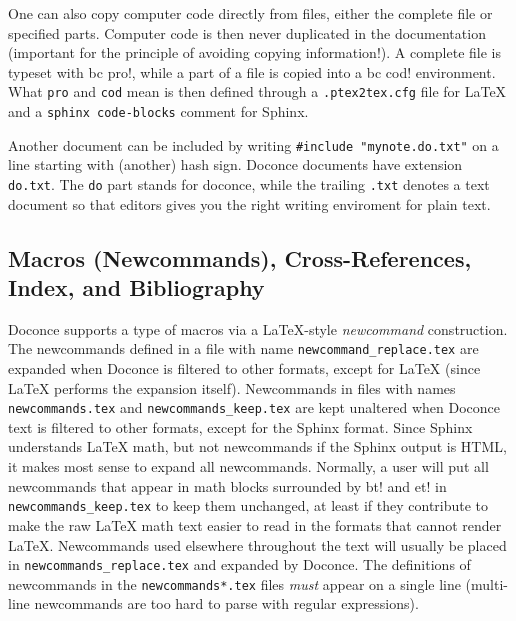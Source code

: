 \documentclass[%
oneside,                 %
final,                   %
10pt]{article}
\begin{document}

One can also copy computer code directly from files, either the
complete file or specified parts.  Computer code is then never
duplicated in the documentation (important for the principle of
avoiding copying information!). A complete file is typeset
with {\fontsize{10pt}{10pt}\Verb!!bc pro!}, while a part of a file is copied into a {\fontsize{10pt}{10pt}\Verb!!bc cod!}
environment. What {\fontsize{10pt}{10pt}\Verb!pro!} and {\fontsize{10pt}{10pt}\Verb!cod!} mean is then defined through
a {\fontsize{10pt}{10pt}\Verb!.ptex2tex.cfg!} file for {\LaTeX} and a {\fontsize{10pt}{10pt}\Verb!sphinx code-blocks!}
comment for Sphinx.

Another document can be included by writing {\fontsize{10pt}{10pt}\Verb!#include "mynote.do.txt"!}
on a line starting with (another) hash sign.  Doconce documents have
extension {\fontsize{10pt}{10pt}\Verb!do.txt!}. The {\fontsize{10pt}{10pt}\Verb!do!} part stands for doconce, while the
trailing {\fontsize{10pt}{10pt}\Verb!.txt!} denotes a text document so that editors gives you the
right writing enviroment for plain text.

\subsection{Macros (Newcommands), Cross-References, Index, and Bibliography}

\label{newcommands}

Doconce supports a type of macros via a LaTeX-style \emph{newcommand}
construction.  The newcommands defined in a file with name
{\fontsize{10pt}{10pt}\Verb!newcommand_replace.tex!} are expanded when Doconce is filtered to
other formats, except for {\LaTeX} (since {\LaTeX} performs the expansion
itself).  Newcommands in files with names {\fontsize{10pt}{10pt}\Verb!newcommands.tex!} and
{\fontsize{10pt}{10pt}\Verb!newcommands_keep.tex!} are kept unaltered when Doconce text is
filtered to other formats, except for the Sphinx format. Since Sphinx
understands {\LaTeX} math, but not newcommands if the Sphinx output is
HTML, it makes most sense to expand all newcommands.  Normally, a user
will put all newcommands that appear in math blocks surrounded by
{\fontsize{10pt}{10pt}\Verb!!bt!} and {\fontsize{10pt}{10pt}\Verb!!et!} in {\fontsize{10pt}{10pt}\Verb!newcommands_keep.tex!} to keep them unchanged, at
least if they contribute to make the raw {\LaTeX} math text easier to
read in the formats that cannot render {\LaTeX}.  Newcommands used
elsewhere throughout the text will usually be placed in
{\fontsize{10pt}{10pt}\Verb!newcommands_replace.tex!} and expanded by Doconce.  The definitions of
newcommands in the {\fontsize{10pt}{10pt}\Verb!newcommands*.tex!} files \emph{must} appear on a single
line (multi-line newcommands are too hard to parse with regular
expressions).
\end{document}
